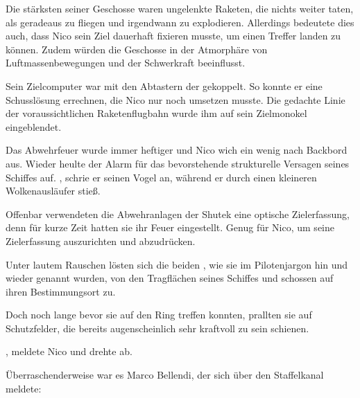 \par

Die stärksten seiner Geschosse waren ungelenkte Raketen, die nichts weiter taten, als geradeaus zu fliegen und irgendwann zu explodieren. Allerdings bedeutete dies auch, dass Nico sein Ziel dauerhaft fixieren musste, um einen Treffer landen zu können. Zudem würden die Geschosse in der Atmorphäre von Luftmassenbewegungen und der Schwerkraft beeinflusst.

\par

Sein Zielcomputer war mit den Abtastern der  gekoppelt. So konnte er eine Schusslösung errechnen, die Nico nur noch umsetzen musste. Die gedachte Linie der voraussichtlichen Raketenflugbahn wurde ihm auf sein Zielmonokel eingeblendet.

\par

Das Abwehrfeuer wurde immer heftiger und Nico wich ein wenig nach Backbord aus. Wieder heulte der Alarm für das bevorstehende strukturelle Versagen seines Schiffes auf. , schrie er seinen Vogel an, während er durch einen kleineren Wolkenausläufer stieß.

\par

Offenbar verwendeten die Abwehranlagen der Shutek eine optische Zielerfassung, denn für kurze Zeit hatten sie ihr Feuer eingestellt. Genug für Nico, um seine Zielerfassung auszurichten und abzudrücken.

\par

Unter lautem Rauschen lösten sich die beiden , wie sie im Pilotenjargon hin und wieder genannt wurden, von den Tragflächen seines Schiffes und schossen auf ihren Bestimmungsort zu.

\par

Doch noch lange bevor sie auf den Ring treffen konnten, prallten sie auf Schutzfelder, die bereits augenscheinlich sehr kraftvoll zu sein schienen.

\par

, meldete Nico und drehte ab. 

\par

Überraschenderweise war es Marco Bellendi, der sich über den Staffelkanal meldete: 
